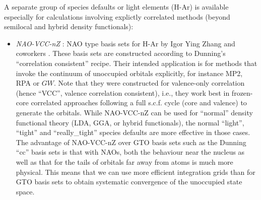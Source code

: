 A separate group of species defaults or light elements (H-Ar) is
available especially for calculations involving explictly correlated
methods (beyond semilocal and hybrid density functionals): 
\begin{itemize}
  \item \emph{NAO-VCC-nZ} : NAO type basis sets for H-Ar by Igor Ying
    Zhang and coworkers \cite{Zhang2013}. These basis sets
    are constructed according to Dunning's ``correlation consistent''
    recipe. Their intended application is for methods that invoke
    the continuum of unoccupied orbitals explicitly, for instance MP2,
    RPA or $GW$. Note that they were constructed for valence-only
    correlation (hence ``VCC'', valence correlation consistent), i.e.,
    they work best in frozen-core correlated approaches following a
    full s.c.f. cycle (core and valence) to generate the
    orbitals. While NAO-VCC-nZ can be used for ``normal'' density
    functional theory (LDA, GGA, or hybrid functionals), the normal
    ``light'', ``tight'' and ``really\_tight'' species defaults are
    more effective in those cases. The advantage of NAO-VCC-nZ over
    GTO basis sets such as the Dunning ``cc'' basis sets is that with
    NAOs, both the behaviour near the nucleus as well as that for the
    tails of orbitals far away from atoms is much more physical. This
    means that we can use more efficient integration grids than for
    GTO basis sets to obtain systematic convergence of the unoccupied
    state space. 
\end{itemize}

